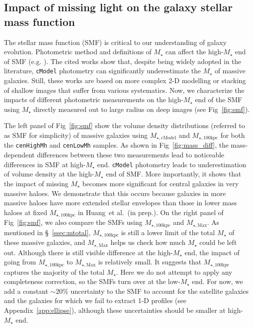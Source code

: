 \documentclass[fleqn,usenatbib]{mnras}
\def\etal{{\ et al.~}}
\def\cmodel{\texttt{cModel}}
\def\rbcg{\texttt{cenHighMh}}
\def\nbcg{\texttt{cenLowMh}}
\def\mstar{{$M_{\star}$}}
\def\mtot{{$M_{\star,100\mathrm{kpc}}$}}
\def\mmax{{$M_{\star,\mathrm{Max}}$}}
\def\mcmodel{{$M_{\star,\mathrm{cModel}}$}}
\begin{document}
\subsection{Impact of missing light on the galaxy stellar mass function}
    \label{ssec:smf}
    
    The stellar mass function (SMF) is critical to our understanding of 
    galaxy evolution.
    Photometric method and definitions of \mstar{} can affect the 
    high-\mstar{} end of SMF (e.g. \citealt{Bernardi2013, dSouza2015, Bernardi2017}). 
    The cited works show that, despite being widely adopted in the literature, 
    \cmodel{} photometry can significantly underestimate the \mstar{} of massive 
    galaxies. 
    Still, these works are based on more complex 2-D modelling or stacking of 
    shallow images that suffer from various systematics.
    Now, we characterize the impacts of different photometric measurements on the 
    high-\mstar{} end of the SMF using \mstar{} directly measured out to large 
    radius on deep images (see Fig~\ref{fig:smf}).
    
    The left panel of Fig~\ref{fig:smf} show the volume density distributions 
    (referred to as SMF for simplicity) of massive galaxies using \mcmodel{} 
    and \mtot{} for both the \rbcg{} and \nbcg{} samples.  
    As shown in Fig~\ref{fig:mass_diff}, the mass-dependent differences between these
    two measurements lead to noticeable differences in SMF at high-\mstar{} end.
    \cmodel{} photometry leads to underestimation of volume density at the 
    high-\mstar{} end of SMF. 
    More importantly, it shows that the impact of missing \mstar{} becomes more 
    significant for central galaxies in very massive haloes. 
    We demonstrate that this occurs because galaxies in more massive haloes 
    have more extended stellar envelopes than those in lower mass haloes at fixed 
    \mtot{} in Huang\etal (in prep.).
    On the right panel of Fig~\ref{fig:smf}, we also compare the SMFs using \mtot{} 
    and \mmax{}. 
    As mentioned in \S~\ref{ssec:mtotal}, \mtot{} is still a lower limit of the total 
    \mstar{} of these massive galaxies, and \mmax{} helps us check how much \mstar{} 
    could be left out.  
    Although there is still visible difference at the high-\mstar{} end, the impact
    of going from \mtot{} to \mmax{} is relatively small. 
    It suggests that \mtot{} captures the majority of the total \mstar{}.
    Here we do not attempt to apply any completeness correction, so the SMFs turn 
    over at the low-\mstar{} end. 
    For now, we add a constant ${\sim}20$\% uncertainty to the SMF to account for 
    the satellite galaxies and the galaxies for which we fail to extract 1-D profiles 
    (see Appendix~\ref{app:ellipse}), although these uncertainties should be smaller 
    at high-\mstar{} end. 
    
\end{document}
